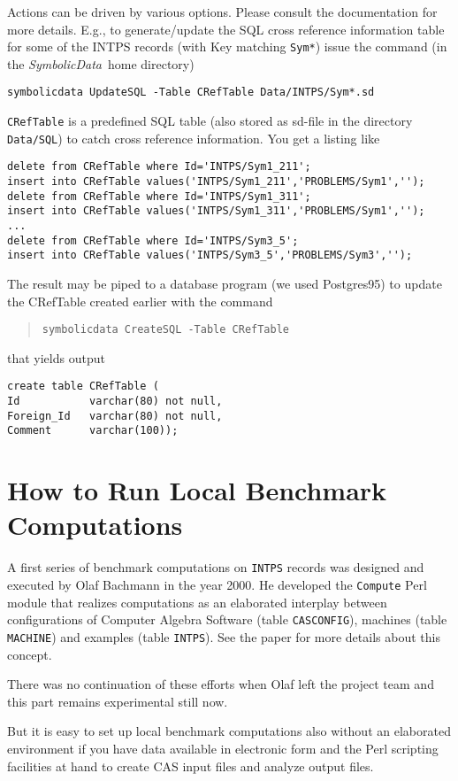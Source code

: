 \documentclass[11pt]{article}
\newcommand{\SD}{{\em Symbo\-lic\-Data}}
\begin{document}
Actions can be driven by various options. Please consult the
documentation for more details.  E.g., to generate/update the SQL
cross reference information table for some of the INTPS records
(with Key matching {\tt Sym*}) issue the command (in the \SD\
home directory)
\begin{center}
\tt symbolicdata UpdateSQL -Table CRefTable Data/INTPS/Sym*.sd
\end{center}
{\tt CRefTable} is a predefined SQL table (also stored as sd-file in
the directory {\tt Data/SQL}) to catch cross reference
information. You get a listing like
{\small\begin{verbatim}
delete from CRefTable where Id='INTPS/Sym1_211';
insert into CRefTable values('INTPS/Sym1_211','PROBLEMS/Sym1','');
delete from CRefTable where Id='INTPS/Sym1_311';
insert into CRefTable values('INTPS/Sym1_311','PROBLEMS/Sym1','');
...
delete from CRefTable where Id='INTPS/Sym3_5';
insert into CRefTable values('INTPS/Sym3_5','PROBLEMS/Sym3','');
\end{verbatim}}
The result may be piped to a database program (we used
Postgres95) to update the CRefTable created earlier with the
command
\begin{quote}
\mbox{\tt symbolicdata CreateSQL -Table CRefTable}
\end{quote}
that yields output
{\small\begin{verbatim}
create table CRefTable (
Id           varchar(80) not null,
Foreign_Id   varchar(80) not null,
Comment      varchar(100));
\end{verbatim}}

\section{How to Run Local Benchmark Computations}

A first series of benchmark computations on {\tt INTPS} records was
designed and executed by Olaf Bachmann in the year 2000. He developed
the {\tt Compute} Perl module that realizes computations as an
elaborated interplay between configurations of Computer Algebra
Software (table {\tt CASCONFIG}), machines (table {\tt MACHINE}) and
examples (table {\tt INTPS}). See the paper \cite{Bachmann_00a} for
more details about this concept.

There was no continuation of these efforts when Olaf left the project
team and this part remains experimental still now.

But it is easy to set up local benchmark computations also
without an ela\-borated environment if you have data available in
electronic form and the Perl scripting facilities at hand to
create CAS input files and analyze output files.
\end{document}
